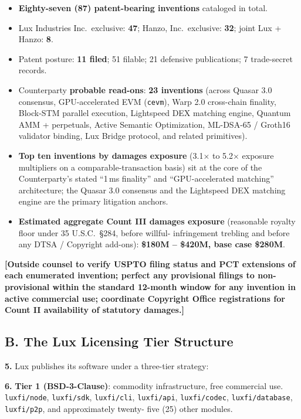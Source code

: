 \documentclass[11pt,letterpaper]{article}
\begin{document}
\begin{itemize}[leftmargin=2em,itemsep=0.05em]
\item \textbf{Eighty-seven (87) patent-bearing inventions} cataloged
in total.
\item Lux Industries Inc.\ exclusive: \textbf{47}; Hanzo, Inc.\
exclusive: \textbf{32}; joint Lux + Hanzo: \textbf{8}.
\item Patent posture: \textbf{11 filed}; 51 filable; 21 defensive
publications; 7 trade-secret records.
\item Counterparty \textbf{probable read-ons}: \textbf{23
inventions} (across Quasar 3.0 consensus, GPU-accelerated EVM
(\texttt{cevm}), Warp 2.0 cross-chain finality, Block-STM parallel
execution, Lightspeed DEX matching engine, Quantum AMM +
perpetuals, Active Semantic Optimization, ML-DSA-65 / Groth16
validator binding, Lux Bridge protocol, and related primitives).
\item \textbf{Top ten inventions by damages exposure} (3.1$\times$
to 5.2$\times$ exposure multipliers on a comparable-transaction
basis) sit at the core of the Counterparty's stated ``1\,ms
finality'' and ``GPU-accelerated matching'' architecture; the
Quasar 3.0 consensus and the Lightspeed DEX matching engine are
the primary litigation anchors.
\item \textbf{Estimated aggregate Count III damages exposure}
(reasonable royalty floor under 35 U.S.C.\ \S 284, before willful-
infringement trebling and before any DTSA / Copyright add-ons):
\textbf{\$180M -- \$420M, base case \$280M}.
\end{itemize}

\textbf{[Outside counsel to verify USPTO filing status and PCT
extensions of each enumerated invention; perfect any provisional
filings to non-provisional within the standard 12-month window for
any invention in active commercial use; coordinate Copyright Office
registrations for Count II availability of statutory damages.]}

\subsection*{B. The Lux Licensing Tier Structure}

\textbf{5.} Lux publishes its software under a three-tier strategy:

\textbf{6.} \textbf{Tier 1 (BSD-3-Clause)}: commodity infrastructure,
free commercial use. \texttt{luxfi/node}, \texttt{luxfi/sdk},
\texttt{luxfi/cli}, \texttt{luxfi/api}, \texttt{luxfi/codec},
\texttt{luxfi/database}, \texttt{luxfi/p2p}, and approximately twenty-
five (25) other modules.
\end{document}
